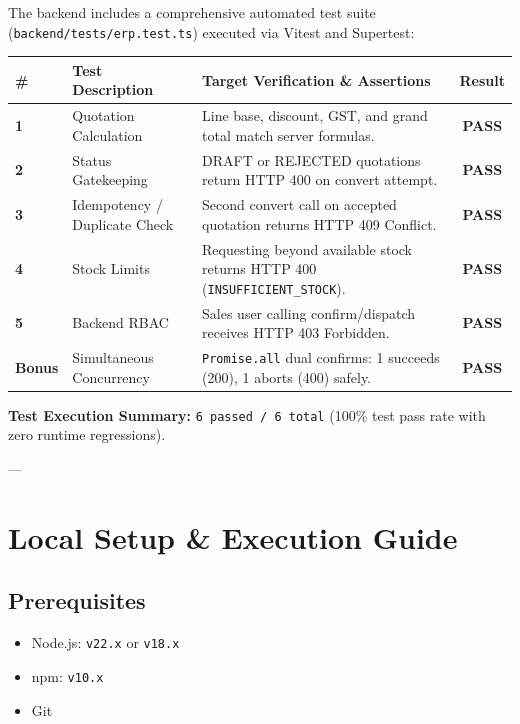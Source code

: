 \documentclass[11pt,a4paper]{article}
\begin{document}
The backend includes a comprehensive automated test suite (\texttt{backend/tests/erp.test.ts}) executed via Vitest and Supertest:

\begin{table}[htbp]
\centering
\small
\begin{tabularx}{\textwidth}{l l X c}
\toprule
\textbf{\#} & \textbf{Test Description} & \textbf{Target Verification \& Assertions} & \textbf{Result} \\
\midrule
\textbf{1} & Quotation Calculation & Line base, discount, GST, and grand total match server formulas. & \textcolor{accent}{\textbf{PASS}} \\
\textbf{2} & Status Gatekeeping & DRAFT or REJECTED quotations return HTTP 400 on convert attempt. & \textcolor{accent}{\textbf{PASS}} \\
\textbf{3} & Idempotency / Duplicate Check & Second convert call on accepted quotation returns HTTP 409 Conflict. & \textcolor{accent}{\textbf{PASS}} \\
\textbf{4} & Stock Limits & Requesting beyond available stock returns HTTP 400 (\texttt{INSUFFICIENT\_STOCK}). & \textcolor{accent}{\textbf{PASS}} \\
\textbf{5} & Backend RBAC & Sales user calling confirm/dispatch receives HTTP 403 Forbidden. & \textcolor{accent}{\textbf{PASS}} \\
\textbf{Bonus} & Simultaneous Concurrency & \texttt{Promise.all} dual confirms: 1 succeeds (200), 1 aborts (400) safely. & \textcolor{accent}{\textbf{PASS}} \\
\bottomrule
\end{tabularx}
\end{table}

\begin{center}
\begin{tcolorbox}[colback=lightgray,colframe=accent,arc=2mm,width=0.95\textwidth]
\textbf{Test Execution Summary:} \texttt{6 passed / 6 total} (100\% test pass rate with zero runtime regressions).
\end{tcolorbox}
\end{center}

---

\section{Local Setup \& Execution Guide}

\subsection{Prerequisites}
\begin{itemize}[itemsep=0.2em]
    \item Node.js: \texttt{v22.x} or \texttt{v18.x}
    \item npm: \texttt{v10.x}
    \item Git
\end{itemize}
\end{document}
